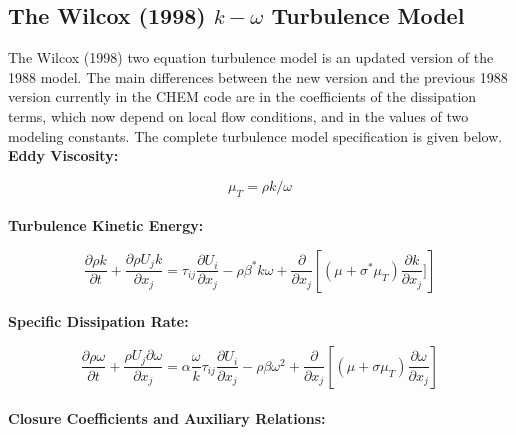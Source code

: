 \subsection{The Wilcox (1998) $k-\omega$ Turbulence Model}
\label{wilcox_kw}

The Wilcox (1998) two equation turbulence model\cite{WilcoxBook} is an
updated version of the 1988 model\cite{Wilcox.88}.  The main
differences between the new version and the previous 1988 version
currently in the CHEM code are in the coefficients of the dissipation
terms, which now depend on local flow conditions, and in the values of
two modeling constants.  The complete turbulence model specification
is given below.\\ 

\noindent
\textbf{Eddy Viscosity:}

\begin{equation}
\mu_T = \rho k/\omega
\label{eddy_viscosity}
\end{equation}\\

\noindent
\textbf{Turbulence Kinetic Energy:}

\begin{equation}
\frac{\partial{\rho k}} {\partial{t}} + \frac{\partial{\rho U_j k}}{\partial{x_j}} =
\tau_{ij} \frac{\partial{U_i}}{\partial{x_j}} - \rho \beta^* k \omega +
\frac{\partial}{\partial{x_j}} \left[ (\mu + \sigma^* \mu_T) \frac{\partial{k}}{\partial{x_j}}] \right]
\label{tke_equation}
\end{equation}\\

\noindent
\textbf{Specific Dissipation Rate:}

\begin{equation}
\frac{\partial{\rho \omega}} {\partial{t}} + \frac{\rho U_j \partial{\omega}}{\partial{x_j}} =
\alpha \frac{\omega}{k} \tau_{ij} \frac{\partial{U_i}}{\partial{x_j}} -
\rho \beta \omega^2 +
\frac{\partial}{\partial{x_j}} \left[ (\mu + \sigma \mu_T) \frac{\partial{\omega}}{\partial{x_j}} \right]
\label{omega_equation}
\end{equation}\\

\noindent
\textbf{Closure Coefficients and Auxiliary Relations:}

